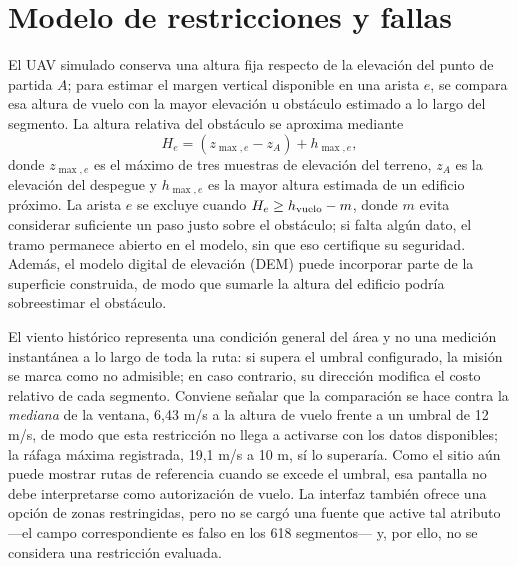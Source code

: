 \documentclass[journal,10pt]{IEEEtran}
\begin{document}
\section{Modelo de restricciones y fallas}
\label{sec:fallas}

El UAV simulado conserva una altura fija respecto de la elevación del punto
de partida $A$; para estimar el margen vertical disponible en una arista
$e$, se compara esa altura de vuelo con la mayor elevación u obstáculo
estimado a lo largo del segmento. La altura relativa del obstáculo se
aproxima mediante
\begin{equation}
 H_e=(z_{\max,e}-z_A)+h_{\max,e},
\end{equation}
donde $z_{\max,e}$ es el máximo de tres muestras de elevación del terreno,
$z_A$ es la elevación del despegue y $h_{\max,e}$ es la mayor altura
estimada de un edificio próximo. La arista $e$ se excluye cuando
$H_e\geq h_{\rm vuelo}-m$, donde $m$ evita considerar suficiente un paso
justo sobre el obstáculo; si falta algún dato, el tramo permanece abierto
en el modelo, sin que eso certifique su seguridad. Además, el modelo
digital de elevación (DEM) puede incorporar parte de la superficie
construida, de modo que sumarle la altura del edificio podría sobreestimar
el obstáculo.

El viento histórico representa una condición general del área y no una
medición instantánea a lo largo de toda la ruta: si supera el umbral
configurado, la misión se marca como no admisible; en caso contrario, su
dirección modifica el costo relativo de cada segmento. Conviene señalar que
la comparación se hace contra la \emph{mediana} de la ventana, 6,43 m/s a la
altura de vuelo frente a un umbral de 12 m/s, de modo que esta restricción
no llega a activarse con los datos disponibles; la ráfaga máxima registrada,
19,1 m/s a 10 m, sí lo superaría. Como el sitio aún puede mostrar rutas de
referencia cuando se excede el umbral, esa pantalla no debe interpretarse
como autorización de vuelo. La interfaz también ofrece una opción de zonas
restringidas, pero no se cargó una fuente que active tal atributo ---el
campo correspondiente es falso en los 618 segmentos--- y, por ello, no se
considera una restricción evaluada.
\end{document}
